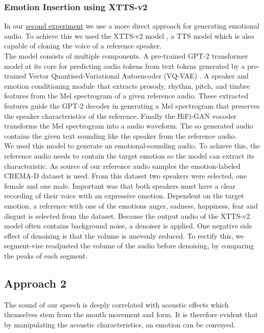 \documentclass[11pt]{article}
\begin{document}
\subsubsection{Emotion Insertion using XTTS-v2}
In our \hyperref[Experiment 2]{second experiment} we use a more direct approach for generating emotional audio. To achieve this we used the XTTS-v2 model \cite{casanova2024xtts}, a TTS model which is also capable of cloning the voice of a reference speaker. \\
The model consists of multiple components. A pre-trained GPT-2 transformer model \cite{radford2019language} at its core for predicting audio tokens from text tokens generated by a pre-trained Vector Quantised-Variational Autoencoder (VQ-VAE) \cite{betker2023better, NIPS2017_7a98af17}. A speaker and emotion conditioning module that extracts prosody, rhythm, pitch, and timbre features from the Mel spectrogram of a given reference audio. These extracted features guide the GPT-2 decoder in generating a Mel spectrogram that preserves the speaker characteristics of the reference. Finally the HiFi-GAN \cite{kong2020hifi} vocoder transforms the Mel spectrogram into a audio waveform. The so generated audio contains the given text sounding like the speaker from the reference audio. \\ 
We used this model to generate an emotional-sounding audio. To achieve this, the reference audio needs to contain the target emotion so the model can extract its characteristic. As source of our reference audio samples the emotion-labeled CREMA-D \cite{cao_data} dataset is used. From this dataset two speakers were selected, one female and one male. Important was that both speakers must have a clear recording of their voice with an expressive emotion. Dependent on the target emotion, a reference with one of the emotions anger, sadness, happiness, fear and disgust is selected from the dataset. Because the output audio of the XTTS-v2 model often contains background noise, a denoiser is applied. One negative side effect of denoising is that the volume is unevenly reduced. To rectify this, we segment-vise readjusted the volume of the audio before denoising, by comparing the peaks of each segment.

\subsection{Approach 2}

The sound of our speech is deeply correlated with acoustic effects which themselves stem from the mouth movement and form\cite{arias_beyond_2020}. It is therefore evident that by manipulating the acoustic characteristics, an emotion can be convayed.
\end{document}
